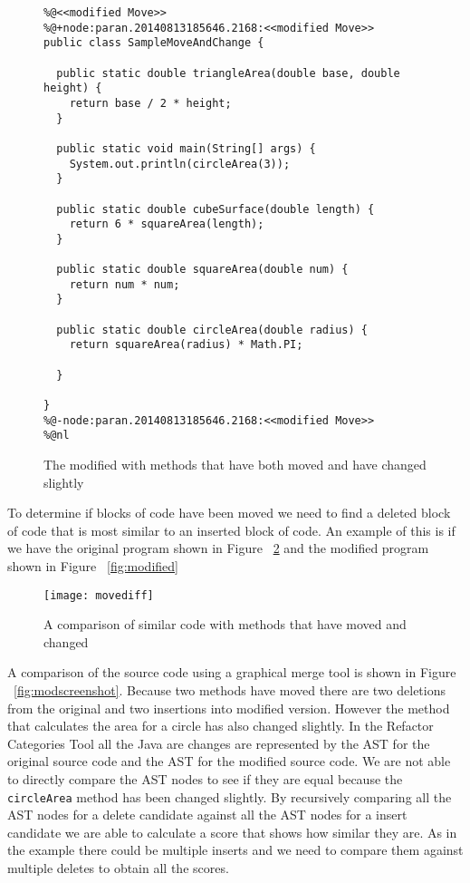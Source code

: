 \begin{figure}[!t]
\begin{lstlisting}
%@<<modified Move>>
%@+node:paran.20140813185646.2168:<<modified Move>>
public class SampleMoveAndChange {

  public static double triangleArea(double base, double height) {
    return base / 2 * height;
  }

  public static void main(String[] args) {
    System.out.println(circleArea(3));
  }

  public static double cubeSurface(double length) {
    return 6 * squareArea(length);
  }

  public static double squareArea(double num) {
    return num * num;
  }

  public static double circleArea(double radius) {
    return squareArea(radius) * Math.PI;

  }

}
%@-node:paran.20140813185646.2168:<<modified Move>>
%@nl
\end{lstlisting}
\caption{The modified with methods that have both moved and have changed slightly}
 \label{fig:orig}
\end{figure}


To determine if blocks of code have been moved we need to find a deleted block of code that is most similar to an inserted block of code.  An example of this is if we have the original program shown in Figure ~\ref{fig:orig} and the modified program shown in Figure ~\ref{fig:modified}

\begin{figure}[!t]
\begin{center}
 \texttt{[image: movediff]}
 \end{center}
\caption{A comparison of similar code with methods that have moved and changed}
 \label{fig:orig}
\end{figure}


A comparison of the source code using a graphical merge tool is shown in Figure ~\ref{fig:modscreenshot}.  Because two methods have moved there are two deletions from the original and two insertions into modified version.  However the method that calculates the area for a circle has also changed slightly. In the Refactor Categories Tool all the Java are changes are represented by the AST for the original source code and the AST for the modified source code. We are not able to directly compare the AST nodes to see if they are equal because the \lstinline{circleArea} method has been changed slightly. By recursively comparing all the AST nodes for a delete candidate against all the AST nodes for a insert candidate we are able to calculate a score that shows how similar they are.  As in the example there could be multiple inserts and we need to compare them against multiple deletes to obtain all the scores.

